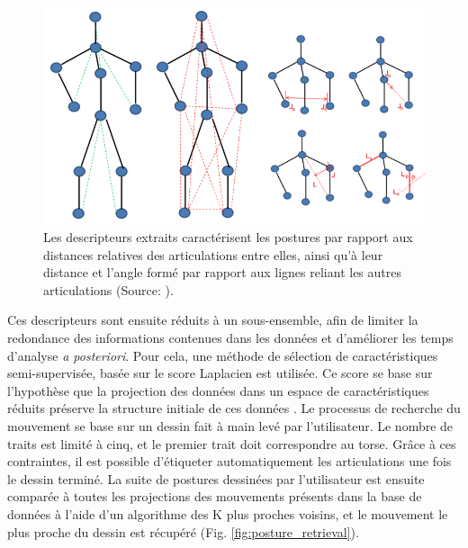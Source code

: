 \begin{figure}[h]
    \centering
    \includegraphics[width=\textwidth]{pictures/skeletons_Xia.png}
    \caption[Descripteurs basés sur les positions relatives des articulations entre elles \parencite{Xiao2015Sbh}]{Les descripteurs extraits caractérisent les postures par rapport aux distances relatives des articulations entre elles, ainsi qu'à leur distance et l'angle formé par rapport aux lignes reliant les autres articulations (Source: \parencite{Xiao2015Sbh}).}
    \label{fig:skeletons_Xia}
\end{figure}

Ces descripteurs sont ensuite réduits à un sous-ensemble, afin de limiter la redondance des informations contenues dans les données et d'améliorer les temps d'analyse \textit{a posteriori}. Pour cela, une méthode de sélection de caractéristiques semi-supervisée, basée sur le score Laplacien est utilisée. Ce score se base sur l'hypothèse que la projection des données dans un espace de caractéristiques réduits préserve la structure initiale de ces données \parencite{He2005LSf}. Le processus de recherche du mouvement se base sur un dessin fait à main levé par l'utilisateur. Le nombre de traits est limité à cinq, et le premier trait doit correspondre au torse. Grâce à ces contraintes, il est possible d'étiqueter automatiquement les articulations une fois le dessin terminé. La suite de postures dessinées par l'utilisateur est ensuite comparée à toutes les projections des mouvements présents dans la base de données à l'aide d'un algorithme des K plus proches voisins, et le mouvement le plus proche du dessin est récupéré (Fig. \ref{fig:posture_retrieval}).


